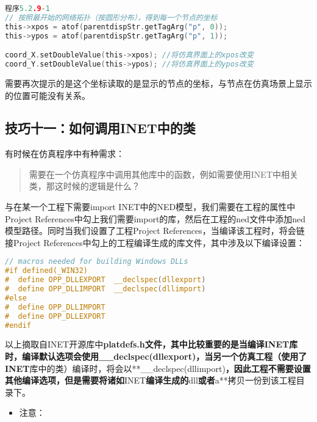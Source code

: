 \begin{lstlisting}[language=c]
程序5.2.9-1
// 按照最开始的网络拓扑（按圆形分布），得到每一个节点的坐标
this->xpos = atof(parentdispStr.getTagArg("p", 0));
this->ypos = atof(parentdispStr.getTagArg("p", 1));

coord_X.setDoubleValue(this->xpos); //将仿真界面上的xpos改变
coord_Y.setDoubleValue(this->ypos); //将仿真界面上的ypos改变

\end{lstlisting}

需要再次提示的是这个坐标读取的是显示的节点的坐标，与节点在仿真场景上显示的位置可能没有关系。

\subsection{技巧十一：如何调用INET中的类}
\label{技巧十一：如何调用inet中的类}

有时候在仿真程序中有种需求：

\begin{quote}
需要在一个仿真程序中调用其他库中的函数，例如需要使用INET中相关类，那这时候的逻辑是什么？
\end{quote}

与在某一个工程下需要import INET中的NED模型，我们需要在工程的属性中Project References中勾上我们需要import的库，然后在工程的ned文件中添加ned模型路径。同时当我们设置了工程Project References，当编译该工程时，将会链接Project References中勾上的工程编译生成的库文件，其中涉及以下编译设置：

\begin{lstlisting}[language=c]
// macros needed for building Windows DLLs
#if defined(_WIN32)
#  define OPP_DLLEXPORT  __declspec(dllexport)
#  define OPP_DLLIMPORT  __declspec(dllimport)
#else
#  define OPP_DLLIMPORT
#  define OPP_DLLEXPORT
#endif

\end{lstlisting}

以上摘取自INET开源库中\textbf{platdefs.h\textbf{文件，其中比较重要的是当编译INET库时，编译默认选项会使用}\_\_declspec(dllexport)\textbf{，当另一个仿真工程（使用了}INET}库中的类）编译时，将会以**\_\_declspec(dllimport)\textbf{，因此工程不需要设置其他编译选项，但是需要将诸如}INET\textbf{编译生成的}dll\textbf{或者}a**拷贝一份到该工程目录下。

\begin{itemize}
\item 注意：

\end{itemize}

